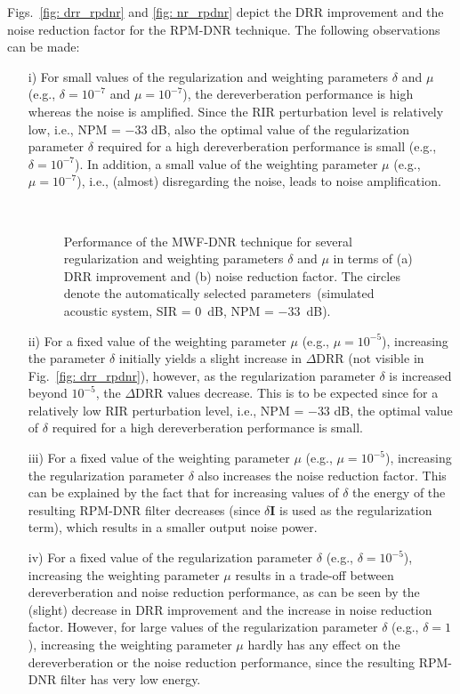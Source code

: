 \documentclass[10pt]{IEEEtran}
\begin{document}
Figs.~\ref{fig: drr_rpdnr} and \ref{fig: nr_rpdnr} depict the DRR improvement and the noise reduction factor for the RPM-DNR technique.
The following observations can be made:
\begin{itemize}
\item[i)] For small values of the regularization and weighting parameters $\delta$ and $\mu$ (e.g., $\delta = 10^{-7}$ and $\mu = 10^{-7}$), the dereverberation performance is high whereas the noise is amplified. 
Since the RIR perturbation level is relatively low, i.e., NPM = $-33$ dB, also the optimal value of the regularization parameter $\delta$ required for a high dereverberation performance is small (e.g., $\delta = 10^{-7}$). 
In addition, a small value of the weighting parameter $\mu$ (e.g., $\mu = 10^{-7}$), i.e., (almost) disregarding the noise, leads to noise amplification.

\begin{figure}[t!]
\centering
\hbox{\subfloat[\label{fig: drr_mwfdnr}]{%

}
\subfloat[\label{fig: nr_mwfdnr}]{%

}}
\caption{Performance of the MWF-DNR technique for several regularization and weighting parameters $\delta$ and $\mu$ in terms of (a) DRR improvement and (b) noise reduction factor. The circles denote the automatically selected parameters~(simulated acoustic system, SIR = $0$~dB, NPM = $-33$~dB).}
\label{fig: mwfdnr}
\end{figure}

 
\item[ii)] For a fixed value of the weighting parameter $\mu$ (e.g., $\mu = 10^{-5}$), increasing the parameter $\delta$ initially yields a slight increase in $\Delta$DRR (not visible in Fig.~\ref{fig: drr_rpdnr}), however, as the regularization parameter $\delta$ is increased beyond $10^{-5}$, the $\Delta$DRR values decrease. 
This is to be expected since for a relatively low RIR perturbation level, i.e., NPM = $-33$ dB, the optimal value of $\delta$ required for a high dereverberation performance is small.
\item[iii)] For a fixed value of the weighting parameter $\mu$ (e.g., $\mu = 10^{-5}$), increasing the regularization parameter $\delta$ also increases the noise reduction factor. This can be explained by the fact that for increasing values of $\delta$ the energy of the resulting RPM-DNR filter decreases (since $\delta \mathbf{I}$ is used as the regularization term), which results in a smaller output noise power.
\item[iv)] {{For a fixed value of the regularization parameter $\delta$ (e.g., $\delta = 10^{-5}$), increasing the weighting parameter $\mu$ results in a trade-off between dereverberation and noise reduction performance, as can be seen by the (slight) decrease in DRR improvement and the increase in noise reduction factor. However, for large values of the regularization parameter $\delta$ (e.g., $\delta = 1$), increasing the weighting parameter $\mu$ hardly has any effect on the dereverberation or the noise reduction performance, since the resulting RPM-DNR filter has very low energy.}}
\end{itemize}
\end{document}
